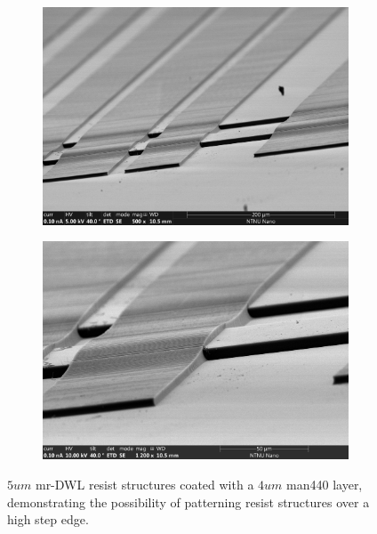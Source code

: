  
 
\begin{figure}
\centering
\begin{subfigure}{.5\textwidth}
  \centering
  \includegraphics[width=\linewidth]{fig/mr-DWL/sem_mr-dwl-2.jpg}
  \label{fig:sfig1}
\end{subfigure}%

\begin{subfigure}{.5\textwidth}
  \centering
  \includegraphics[width=\linewidth]{fig/mr-DWL/sem_mr-dwl.jpg}
  \label{fig:sfig2}
\end{subfigure}
\caption{$5um$ mr-DWL resist structures coated with a $4um$ man440 layer, demonstrating the possibility of patterning resist structures over a high step edge. }
\label{fig:fig}
\end{figure}

